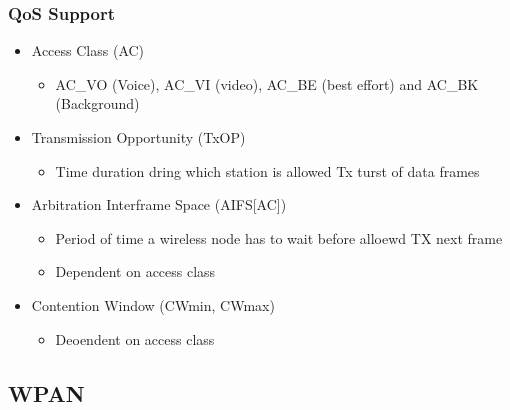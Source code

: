 \documentclass[a4paper]{article}
\begin{document}
\subsubsection{QoS Support}
\begin{itemize}
	\item Access Class (AC)
	\begin{itemize}
		\item AC\_VO (Voice), AC\_VI (video), AC\_BE (best effort) and
			AC\_BK (Background)
	\end{itemize}
	\item Transmission Opportunity (TxOP)
	\begin{itemize}
		\item Time duration dring which station is allowed Tx turst of
			data frames
	\end{itemize}
	\item Arbitration Interframe Space (AIFS[AC])
	\begin{itemize}
		\item Period of time a wireless node has to wait before alloewd
			TX next frame
		\item Dependent on access class
	\end{itemize}
	\item Contention Window (CWmin, CWmax)
	\begin{itemize}
		\item Deoendent on access class
	\end{itemize}
\end{itemize}
\subsection{WPAN}
\end{document}
